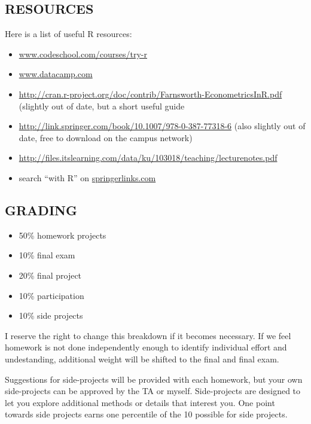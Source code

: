 \documentclass{scrartcl}
\begin{document}
\subsection*{RESOURCES}

Here is a list of useful R resources:
\begin{itemize}
\item \href{www.codeschool.com/courses/try-r}{www.codeschool.com/courses/try-r}
\item \href{www.datacamp.com}{www.datacamp.com}
\item \href{http://cran.r-project.org/doc/contrib/Farnsworth-EconometricsInR.pdf}{http://cran.r-project.org/doc/contrib/Farnsworth-EconometricsInR.pdf} (slightly out of date, but a short useful guide
\item \href{http://link.springer.com/book/10.1007/978-0-387-77318-6}{http://link.springer.com/book/10.1007/978-0-387-77318-6} (also slightly out of date, free to download on the campus network)
\item \href{http://files.itslearning.com/data/ku/103018/teaching/lecturenotes.pdf}{http://files.itslearning.com/data/ku/103018/teaching/lecturenotes.pdf}
\item search ``with R'' on \href{springerlinks.com}{springerlinks.com}
\end{itemize}

\subsection*{GRADING}
\begin{itemize}
\item 50\% homework projects
\item 10\% final exam
\item 20\% final project
\item 10\% participation 
\item 10\% side projects
\end{itemize}

I reserve the right to change this breakdown if it becomes necessary. If we feel homework is not done independently enough to identify individual effort and undestanding, additional weight will be shifted to the final and final exam.

Suggestions for side-projects will be provided with each homework, but your own side-projects can be approved by the TA or myself. Side-projects are designed to let you explore additional methods or details that interest you. One point towards side projects earns one percentile of the 10 possible for side projects.
\end{document}
